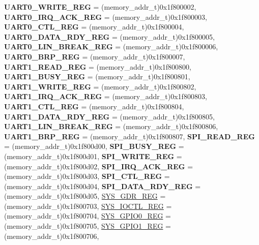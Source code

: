 \begin{DoxyCompactItemize}
{\bfseries U\+A\+R\+T0\+\_\+\+W\+R\+I\+T\+E\+\_\+\+R\+EG} = (memory\+\_\+addr\+\_\+t)0x1f800002, 
{\bfseries U\+A\+R\+T0\+\_\+\+I\+R\+Q\+\_\+\+A\+C\+K\+\_\+\+R\+EG} = (memory\+\_\+addr\+\_\+t)0x1f800003, 
{\bfseries U\+A\+R\+T0\+\_\+\+C\+T\+L\+\_\+\+R\+EG} = (memory\+\_\+addr\+\_\+t)0x1f800004, 
{\bfseries U\+A\+R\+T0\+\_\+\+D\+A\+T\+A\+\_\+\+R\+D\+Y\+\_\+\+R\+EG} = (memory\+\_\+addr\+\_\+t)0x1f800005, 
{\bfseries U\+A\+R\+T0\+\_\+\+L\+I\+N\+\_\+\+B\+R\+E\+A\+K\+\_\+\+R\+EG} = (memory\+\_\+addr\+\_\+t)0x1f800006, 
{\bfseries U\+A\+R\+T0\+\_\+\+B\+R\+P\+\_\+\+R\+EG} = (memory\+\_\+addr\+\_\+t)0x1f800007, 
{\bfseries U\+A\+R\+T1\+\_\+\+R\+E\+A\+D\+\_\+\+R\+EG} = (memory\+\_\+addr\+\_\+t)0x1f800800, 
{\bfseries U\+A\+R\+T1\+\_\+\+B\+U\+S\+Y\+\_\+\+R\+EG} = (memory\+\_\+addr\+\_\+t)0x1f800801, 
{\bfseries U\+A\+R\+T1\+\_\+\+W\+R\+I\+T\+E\+\_\+\+R\+EG} = (memory\+\_\+addr\+\_\+t)0x1f800802, 
{\bfseries U\+A\+R\+T1\+\_\+\+I\+R\+Q\+\_\+\+A\+C\+K\+\_\+\+R\+EG} = (memory\+\_\+addr\+\_\+t)0x1f800803, 
{\bfseries U\+A\+R\+T1\+\_\+\+C\+T\+L\+\_\+\+R\+EG} = (memory\+\_\+addr\+\_\+t)0x1f800804, 
\newline
{\bfseries U\+A\+R\+T1\+\_\+\+D\+A\+T\+A\+\_\+\+R\+D\+Y\+\_\+\+R\+EG} = (memory\+\_\+addr\+\_\+t)0x1f800805, 
{\bfseries U\+A\+R\+T1\+\_\+\+L\+I\+N\+\_\+\+B\+R\+E\+A\+K\+\_\+\+R\+EG} = (memory\+\_\+addr\+\_\+t)0x1f800806, 
{\bfseries U\+A\+R\+T1\+\_\+\+B\+R\+P\+\_\+\+R\+EG} = (memory\+\_\+addr\+\_\+t)0x1f800807, 
{\bfseries S\+P\+I\+\_\+\+R\+E\+A\+D\+\_\+\+R\+EG} = (memory\+\_\+addr\+\_\+t)0x1f800d00, 
{\bfseries S\+P\+I\+\_\+\+B\+U\+S\+Y\+\_\+\+R\+EG} = (memory\+\_\+addr\+\_\+t)0x1f800d01, 
{\bfseries S\+P\+I\+\_\+\+W\+R\+I\+T\+E\+\_\+\+R\+EG} = (memory\+\_\+addr\+\_\+t)0x1f800d02, 
{\bfseries S\+P\+I\+\_\+\+I\+R\+Q\+\_\+\+A\+C\+K\+\_\+\+R\+EG} = (memory\+\_\+addr\+\_\+t)0x1f800d03, 
{\bfseries S\+P\+I\+\_\+\+C\+T\+L\+\_\+\+R\+EG} = (memory\+\_\+addr\+\_\+t)0x1f800d04, 
{\bfseries S\+P\+I\+\_\+\+D\+A\+T\+A\+\_\+\+R\+D\+Y\+\_\+\+R\+EG} = (memory\+\_\+addr\+\_\+t)0x1f800d05, 
\mbox{\hyperlink{a00020_adadaa0ab1ebbd7ba9b70dfd24c3ed44da81072e84e040f3ee8c531655c60e325d}{S\+Y\+S\+\_\+\+G\+D\+R\+\_\+\+R\+EG}} = (memory\+\_\+addr\+\_\+t)0x1f800703, 
\mbox{\hyperlink{a00020_adadaa0ab1ebbd7ba9b70dfd24c3ed44da835280d31e2f3f5bc44bb1eb58024d80}{S\+Y\+S\+\_\+\+I\+O\+C\+T\+L\+\_\+\+R\+EG}} = (memory\+\_\+addr\+\_\+t)0x1f800704, 
\mbox{\hyperlink{a00020_adadaa0ab1ebbd7ba9b70dfd24c3ed44dabc4ad11c216d218134b37833679bab11}{S\+Y\+S\+\_\+\+G\+P\+I\+O0\+\_\+\+R\+EG}} = (memory\+\_\+addr\+\_\+t)0x1f800705, 
\mbox{\hyperlink{a00020_adadaa0ab1ebbd7ba9b70dfd24c3ed44da394e80146590b4c461618c0c8ba298a9}{S\+Y\+S\+\_\+\+G\+P\+I\+O1\+\_\+\+R\+EG}} = (memory\+\_\+addr\+\_\+t)0x1f800706, 

\end{DoxyCompactItemize}
